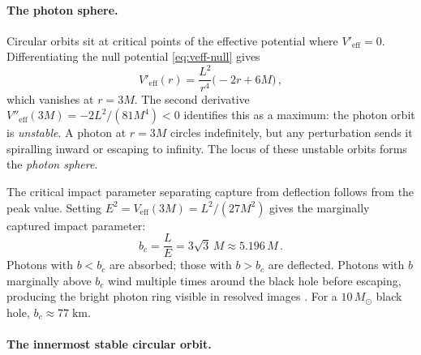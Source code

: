 \paragraph{The photon sphere.}

Circular orbits sit at critical points of the effective potential
where $V'_{\text{eff}} = 0$.  Differentiating the null potential
\eqref{eq:veff-null} gives
%
\begin{equation}
  V'_{\text{eff}}(r)
  = \frac{L^2}{r^4}\bigl({-}2r + 6M\bigr) \,,
  \label{eq:veff-null-deriv}
\end{equation}
%
which vanishes at $r = 3M$.  The second derivative
$V''_{\text{eff}}(3M) = -2L^2/(81M^4) < 0$ identifies this as a
maximum: the photon orbit is \emph{unstable}.  A photon at $r = 3M$
circles indefinitely, but any perturbation sends it spiralling inward
or escaping to infinity.  The locus of these unstable orbits forms the
\emph{photon sphere}.

The critical impact parameter separating capture from deflection
follows from the peak value.  Setting $E^2 = V_{\text{eff}}(3M) =
L^2/(27M^2)$ gives the marginally captured impact parameter:
%
\begin{equation}
  b_c = \frac{L}{E} = 3\sqrt{3}\,M \approx 5.196\,M \,.
  \label{eq:critical-impact}
\end{equation}
%
Photons with $b < b_c$ are absorbed; those with $b > b_c$ are
deflected.  Photons with $b$ marginally above $b_c$ wind multiple
times around the black hole before escaping, producing the bright
photon ring visible in resolved images \cite{Johnson2020}.  For a
$10\,M_\odot$ black hole, $b_c \approx 77\;\text{km}$.

\paragraph{The innermost stable circular orbit.}

